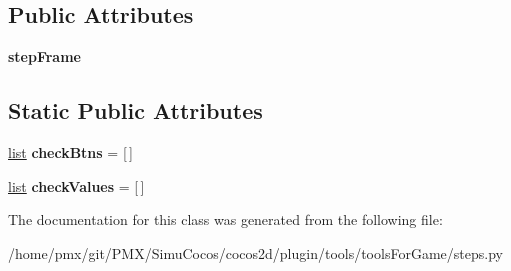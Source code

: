 \subsection*{Public Attributes}
\begin{DoxyCompactItemize}
\item 
\mbox{\label{classsteps_1_1step2_ae60a521d4d803fcb466648f1271b7612}} 
{\bfseries step\+Frame}
\end{DoxyCompactItemize}
\subsection*{Static Public Attributes}
\begin{DoxyCompactItemize}
\item 
\mbox{\label{classsteps_1_1step2_a4a4a25b287c0d3a9f73e81f4a05ddd59}} 
\hyperlink{protocollist-p}{list} {\bfseries check\+Btns} = \mbox{[}$\,$\mbox{]}
\item 
\mbox{\label{classsteps_1_1step2_a0af77083cec569b4fdde7c34e5c8d671}} 
\hyperlink{protocollist-p}{list} {\bfseries check\+Values} = \mbox{[}$\,$\mbox{]}
\end{DoxyCompactItemize}


The documentation for this class was generated from the following file\+:\begin{DoxyCompactItemize}
\item 
/home/pmx/git/\+P\+M\+X/\+Simu\+Cocos/cocos2d/plugin/tools/tools\+For\+Game/steps.\+py\end{DoxyCompactItemize}

